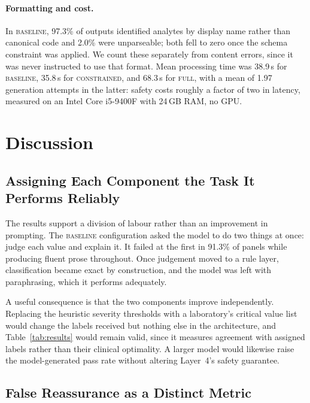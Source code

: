 \documentclass{svproc}
\begin{document}
\paragraph{Formatting and cost.}
In \textsc{baseline}, 97.3\% of outputs identified analytes by display name
rather than canonical code and 2.0\% were unparseable; both fell to zero
once the schema constraint was applied. We count these separately from
content errors, since it was never instructed to use that format. Mean
processing time was 38.9\,s for \textsc{baseline}, 35.8\,s for
\textsc{constrained}, and 68.3\,s for \textsc{full}, with a mean of 1.97
generation attempts in the latter: safety costs roughly a factor of two in
latency, measured on an Intel Core i5-9400F with 24\,GB RAM, no GPU.


\section{Discussion}
\label{sec:discussion}

\subsection{Assigning Each Component the Task It Performs Reliably}

The results support a division of labour rather than an improvement in
prompting. The \textsc{baseline} configuration asked the model to do two
things at once: judge each value and explain it. It failed at the first in
91.3\% of panels while producing fluent prose throughout. Once judgement
moved to a rule layer, classification became exact by construction, and
the model was left with paraphrasing, which it performs adequately.

A useful consequence is that the two components improve independently.
Replacing the heuristic severity thresholds with a laboratory's critical
value list would change the labels received but nothing else in the
architecture, and Table~\ref{tab:results} would remain valid, since it
measures agreement with assigned labels rather than their clinical
optimality. A larger model would likewise raise the model-generated pass
rate without altering Layer~4's safety guarantee.

\subsection{False Reassurance as a Distinct Metric}
\end{document}
